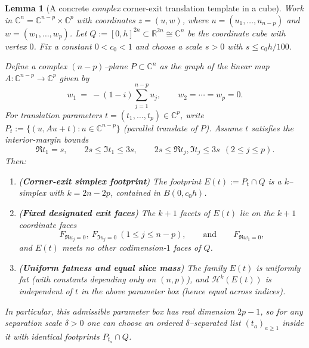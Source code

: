 \documentclass[11pt]{article}
\numberwithin{equation}{section}  %
\theoremstyle{plain}
\newtheorem{lemma}[theorem]{Lemma}
\theoremstyle{definition}
\theoremstyle{remark}
\newcommand{\R}{\mathbb{R}}
\newcommand{\C}{\mathbb{C}}
\begin{document}
\begin{lemma}[A concrete \emph{complex} corner-exit translation template in a cube]\label{lem:complex-corner-exit-template}
Work in $\C^n=\C^{n-p}\times\C^p$ with coordinates $z=(u,w)$, where $u=(u_1,\dots,u_{n-p})$ and $w=(w_1,\dots,w_p)$.
Let $Q:=[0,h]^{2n}\subset\R^{2n}\cong\C^n$ be the coordinate cube with vertex $0$.
Fix a constant $0<c_0<1$ and choose a scale $s>0$ with $s\le c_0 h/100$.

\smallskip\noindent
Define a complex $(n-p)$--plane $P\subset\C^n$ as the graph of the linear map $A:\C^{n-p}\to\C^p$ given by
\[
w_1\ =\ -(1-i)\sum_{j=1}^{n-p}u_j,\qquad w_2=\cdots=w_p=0.
\]
For translation parameters $t=(t_1,\dots,t_p)\in\C^p$, write $P_t:=\{(u,Au+t):u\in\C^{n-p}\}$ (parallel translate of $P$).
Assume $t$ satisfies the \emph{interior-margin} bounds
\[
\Re t_1=s,\qquad 2s\le \Im t_1\le 3s,
\qquad
2s\le \Re t_j,\Im t_j\le 3s\ \ (2\le j\le p).
\]
Then:
\begin{enumerate}
\item[\textnormal{(i)}] (\textbf{Corner-exit simplex footprint}) The footprint $E(t):=P_t\cap Q$ is a $k$--simplex with $k=2n-2p$,
contained in $B(0,c_0h)$.
\item[\textnormal{(ii)}] (\textbf{Fixed designated exit faces}) The $k\!+\!1$ facets of $E(t)$ lie on the $k\!+\!1$ coordinate faces
\[
F_{\Re u_j=0},\ F_{\Im u_j=0}\ (1\le j\le n-p),\qquad\text{and}\qquad F_{\Re w_1=0},
\]
and $E(t)$ meets no other codimension-$1$ faces of $Q$.
\item[\textnormal{(iii)}] (\textbf{Uniform fatness and equal slice mass}) The family $E(t)$ is uniformly fat (with constants depending only on $(n,p)$),
and $\mathcal H^k(E(t))$ is independent of $t$ in the above parameter box (hence equal across indices).
\end{enumerate}
In particular, this admissible parameter box has real dimension $2p-1$, so for any separation scale $\delta>0$ one can choose an ordered $\delta$--separated
list $(t_a)_{a\ge 1}$ inside it with identical footprints $P_{t_a}\cap Q$.
\end{lemma}
\end{document}
